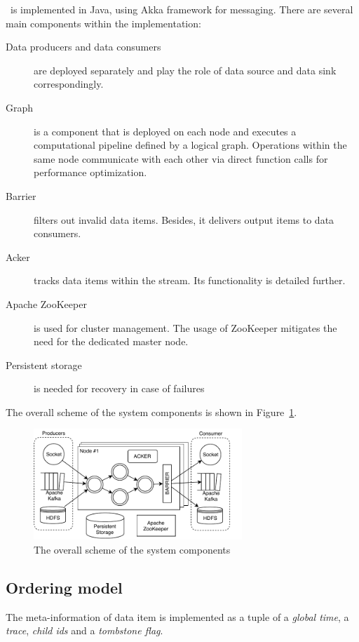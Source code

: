 \label{fs-impl}

\FlameStream\ is implemented in Java, using Akka framework for messaging. There are several main components within the implementation:
\begin{description}
  \item[Data producers and data consumers] are deployed separately and play the role of data source and data sink correspondingly.

  \item[Graph] is a component that is deployed on each node and executes a computational pipeline defined by a logical graph. Operations within the same node communicate with each other via direct function calls for performance optimization.

  \item[Barrier] filters out invalid data items. Besides, it delivers output items to data consumers.

  \item[Acker] tracks data items within the stream. Its functionality is detailed further.

  \item[Apache ZooKeeper] is used for cluster management. The usage of ZooKeeper mitigates the need for the dedicated master node.

  \item[Persistent storage] is needed for recovery in case of failures
\end{description}

The overall scheme of the system components is shown in Figure~\ref{system-architecture}.

\begin{figure}[ht]
  \centering
  \includegraphics[width=0.70\textwidth]{pics/arch}
  \caption{The overall scheme of the system components}
  \label {system-architecture}
\end{figure}

\subsection{Ordering model}
The meta-information of data item is implemented as a tuple of a {\it global time}, a {\it trace}, {\it child ids} and a {\it tombstone flag}.


